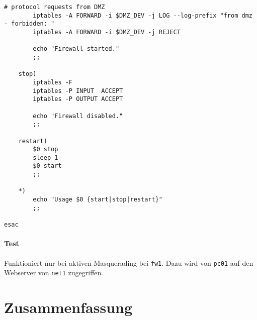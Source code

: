 \begin{lstlisting}[label=lst:masq,caption={Basisskript interne Firewall.}]
        # protocol requests from DMZ
        iptables -A FORWARD -i $DMZ_DEV -j LOG --log-prefix "from dmz - forbidden: "
        iptables -A FORWARD -i $DMZ_DEV -j REJECT

        echo "Firewall started."
        ;;

    stop)
        iptables -F
        iptables -P INPUT  ACCEPT
        iptables -P OUTPUT ACCEPT

        echo "Firewall disabled."
        ;;

    restart)
        $0 stop
        sleep 1
        $0 start
        ;;

    *)
        echo "Usage $0 {start|stop|restart}"
        ;;

esac
\end{lstlisting}

\paragraph{Test} Funktioniert nur bei aktiven Masquerading bei {\tt fw1}.
Dazu wird von {\tt pc01} auf den Webserver von {\tt net1} zugegriffen.

\section{Zusammenfassung}
